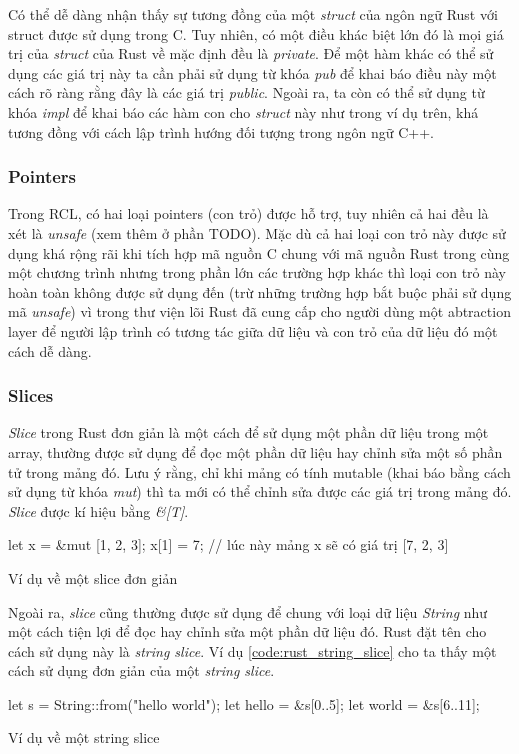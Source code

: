 Có thể dễ dàng nhận thấy sự tương đồng của một \emph{struct} của ngôn ngữ Rust với struct được sử dụng trong C.
Tuy nhiên, có một điều khác biệt lớn đó là mọi giá trị của \emph{struct} của Rust về mặc định đều là \emph{private}.
Để một hàm khác có thể sử dụng các giá trị này ta cần phải sử dụng từ khóa \emph{pub} để khai báo điều này một cách rõ ràng rằng đây là các giá trị \emph{public}.
Ngoài ra, ta còn có thể sử dụng từ khóa \emph{impl} để khai báo các hàm con cho \emph{struct} này như trong ví dụ trên, khá tương đồng với cách lập trình hướng đối tượng trong ngôn ngữ C++.

\subsubsection{Pointers}
Trong RCL, có hai loại pointers (con trỏ) được hỗ trợ, tuy nhiên cả hai đều là xét là \emph{unsafe} (xem thêm ở phần TODO).
Mặc dù cả hai loại con trỏ này được sử dụng khá rộng rãi khi tích hợp mã nguồn C chung với mã nguồn Rust trong cùng một chương trình nhưng trong phần lớn các trường hợp khác thì loại con trỏ này hoàn toàn không được sử dụng đến (trừ những trường hợp bắt buộc phải sử dụng mã \emph{unsafe}) vì trong thư viện lõi Rust đã cung cấp cho người dùng một abtraction layer để người lập trình có tương tác giữa dữ liệu và con trỏ của dữ liệu đó một cách dễ dàng.

\subsubsection{Slices}
\emph{Slice} trong Rust đơn giản là một cách để sử dụng một phần dữ liệu trong một array, thường được sử dụng để đọc một phần dữ liệu hay chỉnh sửa một số phần tử trong mảng đó.
Lưu ý rằng, chỉ khi mảng có tính mutable (khai báo bằng cách sử dụng từ khóa \emph{mut}) thì ta mới có thể chỉnh sửa được các giá trị trong mảng đó.
\emph{Slice} được kí hiệu bằng \emph{\&[T]}.
\begin{listing}
\begin{rustcode}
let x = &mut [1, 2, 3];
x[1] = 7; // lúc này mảng x sẽ có giá trị [7, 2, 3]
\end{rustcode}
\caption{Ví dụ về một slice đơn giản}
\label{code:rust_slice_vector_example}
\end{listing}

Ngoài ra, \emph{slice} cũng thường được sử dụng để chung với loại dữ liệu \emph{String} như một cách tiện lợi để đọc hay chỉnh sửa một phần dữ liệu đó.
Rust đặt tên cho cách sử dụng này là \emph{string slice}.
Ví dụ \ref{code:rust_string_slice} cho ta thấy một cách sử dụng đơn giản của một \emph{string slice}.
\begin{listing}
\begin{rustcode}
let s = String::from("hello world");
let hello = &s[0..5];
let world = &s[6..11];
\end{rustcode}
\caption{Ví dụ về một string slice}
\label{code:rust_string_slice}
\end{listing}
